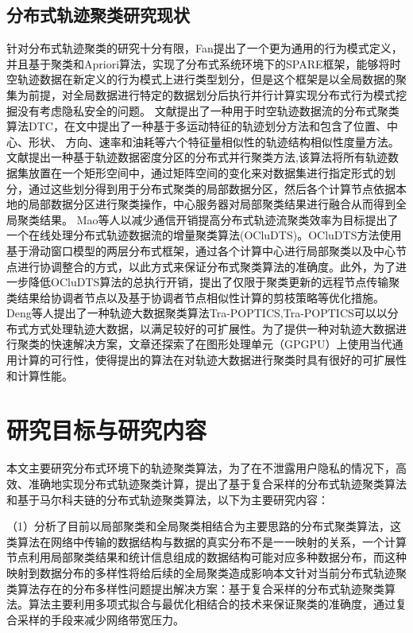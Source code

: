 \subsection{分布式轨迹聚类研究现状}
针对分布式轨迹聚类的研究十分有限，Fan提出了一个更为通用的行为模式定义，并且基于聚类和Apriori算法，实现了分布式系统环境下的SPARE框架，能够将时空轨迹数据在新定义的行为模式上进行类型划分，但是这个框架是以全局数据的聚集为前提，对全局数据进行特定的数据划分后执行并行计算实现分布式行为模式挖掘没有考虑隐私安全的问题。
文献\cite{肖源分布式车辆时空轨迹异常检测算法研究}提出了一种用于时空轨迹数据流的分布式聚类算法DTC，在文中提出了一种基于多运动特征的轨迹划分方法和包含了位置、中心、形状、
方向、速率和油耗等六个特征量相似性的轨迹结构相似性度量方法。
文献\cite{Wang2018A}提出一种基于轨迹数据密度分区的分布式并行聚类方法,该算法将所有轨迹数据集放置在一个矩形空间中，通过矩阵空间的变化来对数据集进行指定形式的划分，通过这些划分得到用于分布式聚类的局部数据分区，然后各个计算节点依据本地的局部数据分区进行聚类操作，中心服务器对局部聚类结果进行融合从而得到全局聚类结果。
Mao等人以减少通信开销提高分布式轨迹流聚类效率为目标提出了一个在线处理分布式轨迹数据流的增量聚类算法(OCluDTS)。OCluDTS方法使用基于滑动窗口模型的两层分布式框架，通过各个计算中心进行局部聚类以及中心节点进行协调整合的方式，以此方式来保证分布式聚类算法的准确度。此外，为了进一步降低OCluDTS算法的总执行开销，提出了仅限于聚类更新的远程节点传输聚类结果给协调者节点以及基于协调者节点相似性计算的剪枝策略等优化措施。
Deng等人提出了一种轨迹大数据聚类算法Tra-POPTICS,Tra-POPTICS可以以分布式方式处理轨迹大数据，以满足较好的可扩展性。为了提供一种对轨迹大数据进行聚类的快速解决方案，文章还探索了在图形处理单元（GPGPU）上使用当代通用计算的可行性，使得提出的算法在对轨迹大数据进行聚类时具有很好的可扩展性和计算性能。


\section{研究目标与研究内容}

本文主要研究分布式环境下的轨迹聚类算法，为了在不泄露用户隐私的情况下，高效、准确地实现分布式轨迹聚类计算，提出了基于复合采样的分布式轨迹聚类算法和基于马尔科夫链的分布式轨迹聚类算法，以下为主要研究内容：

（1）分析了目前以局部聚类和全局聚类相结合为主要思路的分布式聚类算法，这类算法在网络中传输的数据结构与数据的真实分布不是一一映射的关系，一个计算节点利用局部聚类结果和统计信息组成的数据结构可能对应多种数据分布，而这种映射到数据分布的多样性将给后续的全局聚类造成影响本文针对当前分布式轨迹聚类算法存在的分布多样性问题提出解决方案：基于复合采样的分布式轨迹聚类算法。算法主要利用多项式拟合与最优化相结合的技术来保证聚类的准确度，通过复合采样的手段来减少网络带宽压力。

